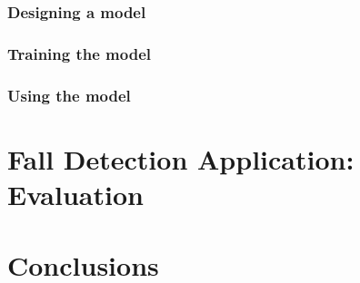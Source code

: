 \documentclass[12pt, a4paper, onecolumn]{article}
\begin{document}
	\subsubsection{Designing a model}
	
	\subsubsection{Training the model}
	
	\subsubsection{Using the model}
	
	
	
	\newpage
	
	\section{Fall Detection Application: Evaluation}
	\newpage
	
	\section{Conclusions}
	\newpage
		
	
	
\end{document}
